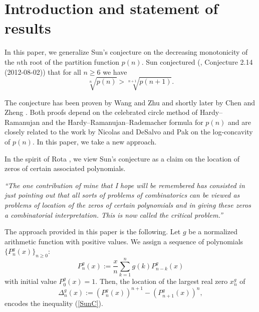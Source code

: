 \documentclass[11pt,reqno]{amsart}
\theoremstyle{plain}
\theoremstyle{remark}
\theoremstyle{definition}
\numberwithin{equation}{section}
\begin{document}
\section{Introduction and statement of results}
In this paper, we generalize Sun's conjecture \cite{Su13} on the decreasing monotonicity of the $n$th root of the partition function $p(n)$. Sun conjectured (\cite{Su13}, Conjecture 2.14 (2012-08-02)) that for all $n\geq 6$ we have
\begin{equation}\label{SunC}
\sqrt[n]{p(n)} > \sqrt[n+1]{p(n+1)}.
\end{equation}


The conjecture has been proven by Wang and Zhu \cite{WZ14}
and shortly later by Chen and Zheng \cite{CZ17}. Both proofs 
depend on the celebrated circle method of Hardy--Ramanujan and the Hardy--Ramanujan--Rademacher formula for $p(n)$ and are closely related to
the work by
Nicolas \cite{Ni78} and DeSalvo and Pak \cite{DP15}
on the log-concavity of $p(n)$.
In this paper, we take a new approach. 

In the spirit of Rota \cite{RS07}, we view Sun's conjecture as a claim on the location of
zeros of certain associated
polynomials. 
\begin{center}{\it
``The one contribution of mine that I hope will be remembered
has consisted in just pointing out that all sorts of problems of
combinatorics can be viewed as problems of location of the zeros of
certain polynomials and in giving these zeros a combinatorial interpretation.
This is now called the critical problem.''}
\end{center}
The approach provided in this paper is the following.
Let $g$ be a normalized arithmetic function with positive values.
We assign a sequence of polynomials $\{P_n^g(x)\}_{n\geq 0}$:
\begin{equation}\label{polynomials}
P_n^g(x):= \frac{x}{n} \sum_{k=1}^n g(k) P_{n-k}^g(x)
\end{equation}
with initial value $P_0^g(x)=1$. Then, the location of the largest real zero $x_n^g$ of
\begin{equation}\label{delta}
\Delta_n^g(x):= \left(P_n^g(x)\right)^{n+1}-\left(P_{n+1}^g(x)\right)^n,
\end{equation}
encodes the inequality (\ref{SunC}). 
\end{document}
